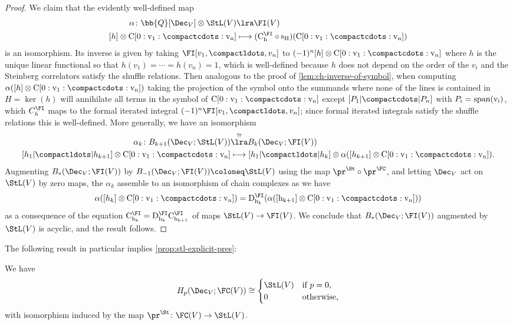 \documentclass[a4paper]{amsart}
\begin{document}
\begin{proof}We claim that the evidently well-defined map
\begin{align*}\alpha \colon \bb{Q}[\Dec_V] \otimes \StL(V) &\lra \FI(V) \\
[h] \otimes \rm{C}[0:v_1:\compactcdots:v_n] &\longmapsto (\rm{C}^\FI_h \circ s_H)(\rm{C}[0:v_1:\compactcdots:v_n])\end{align*}
is an isomorphism. Its inverse is given by taking $\FI[v_1,\compactldots,v_n]$ to $(-1)^n [h] \otimes \rm{C}[0:v_1:\compactcdots:v_n]$ where $h$ is the unique linear functional so that $h(v_1) = \cdots = h(v_n)=1$, which is well-defined because $h$ does not depend on the order of the $v_i$ and the Steinberg correlators satisfy the shuffle relations. Then analogous to the proof of \cref{lem:ch-inverse-of-symbol}, when computing $\alpha([h] \otimes \rm{C}[0:v_1:\compactcdots:v_n])$ taking the projection of the symbol onto the summands where none of the lines is contained in $H = \ker(h)$ will annihilate all terms in the symbol of $\rm{C}[0:v_1:\compactcdots:v_n]$ except $[P_1|\compactcdots|P_n]$ with $P_i = \rm{span}(v_i)$, which $C^\FI_h$ maps to the formal iterated integral $(-1)^n \FI[v_1,\compactldots,v_n]$; since formal iterated integrals satisfy the shuffle relations this is well-defined. More generally, we have an isomorphism
\begin{align*} \alpha_k \colon B_{k+1}(\Dec_V;\StL(V)) &\overset{\cong}\lra B_k(\Dec_V;\FI(V)) \\
[h_1|\compactldots|h_{k+1}] \otimes \rm{C}[0:v_1:\compactcdots:v_n] &\longmapsto [h_1|\compactldots|h_k] \otimes \alpha([h_{k+1}] \otimes \rm{C}[0:v_1:\compactcdots:v_n]).\end{align*}
Augmenting $B_*(\Dec_V;\FI(V))$ by $B_{-1}(\Dec_V;\FI(V)) \coloneq \StL(V)$ using the map $\pr^\St \circ \pr^\FC$, and letting $\Dec_V$ act on $\StL(V)$ by zero maps, the $\alpha_k$ assemble to an isomorphism of chain complexes as we have
\[\alpha([h_k] \otimes \rm{C}[0:v_1:\compactcdots:v_n]) = D^\FI_{h_k}(\alpha([h_{k+1}] \otimes \rm{C}[0:v_1:\compactcdots:v_n]))\]
as a consequence of the equation $\rm{C}^\FI_{h_k} = D^\FI_{h_k} \rm{C}^{\FI}_{h_{k+1}}$ of maps $\StL(V) \to \FI(V)$. We conclude that $B_*(\Dec_V;\FI(V))$ augmented by $\StL(V)$ is acyclic, and the result follows.
\end{proof}

The following result in particular implies \cref{prop:stl-explicit-pres}:

\begin{proposition}\label{prop:stl-resolution} We have
\[H_p(\Dec_V;\FC(V)) \cong \begin{cases} \StL(V) & \text{if $p =0$,} \\
0 & \text{otherwise,}\end{cases}\]
with isomorphism induced by the map $\pr^\St \colon \FC(V) \to \StL(V)$.
\end{proposition}
\end{document}
